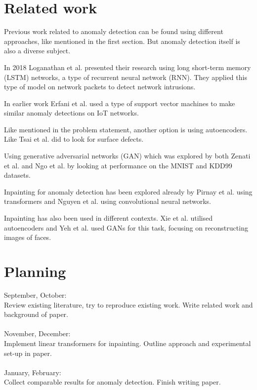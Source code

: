 \documentclass{article}
\begin{document}
\section{Related work}

Previous work related to anomaly detection can be found using different approaches, like mentioned in the first section. But anomaly detection itself is also a diverse subject.

In 2018 Loganathan et al.\cite{Anomaly-LSTM:2018} presented their research using long short-term memory (LSTM) networks, a type of recurrent neural network (RNN). They applied this type of model on network packets to detect network intrusions.

In earlier work Erfani et al.\cite{Anomaly-SVM:2016} used a type of support vector machines to make similar anomaly detections on IoT networks.

Like mentioned in the problem statement, another option is using autoencoders. Like Tsai et al.\cite{Autoencoder-Detection:2021} did to look for surface defects.

Using generative adversarial networks (GAN) which was explored by both Zenati et al.\cite{Anomaly-GAN:2019} and Ngo et al.\cite{GAN2:2019} by looking at performance on the MNIST and KDD99 datasets.

Inpainting for anomaly detection has been explored already by Pirnay et al.\cite{Inpainting:2021} using transformers and Nguyen et al.\cite{adversarial-inpainting:2021} using convolutional neural networks.

Inpainting has also been used in different contexts. Xie et al.\cite{inpainting-dnn:2012} utilised autoencoders and Yeh et al.\cite{inpainting-generative:2017} used GANs for this task, focusing on reconstructing images of faces. 

\section{Planning}

September, October:\\
Review existing literature, try to reproduce existing work. Write related work and background of paper.\\
\\
November, December:\\
Implement linear transformers for inpainting. Outline approach and experimental set-up in paper.\\
\\
January, February:\\
Collect comparable results for anomaly detection. Finish writing paper.


 

\end{document}
